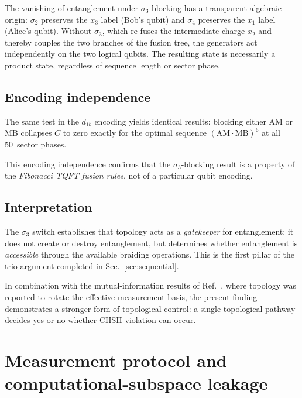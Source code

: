\documentclass[aps,pra,twocolumn,superscriptaddress,longbibliography,floatfix,nofootinbib]{revtex4-2}
\begin{document}
The vanishing of entanglement under $\sigma_3$-blocking has a
transparent algebraic origin:
$\sigma_2$ preserves the $x_3$ label (Bob's qubit) and $\sigma_4$
preserves the $x_1$ label (Alice's qubit).
Without $\sigma_3$, which re-fuses the intermediate charge $x_2$ and
thereby couples the two branches of the fusion tree, the generators
act independently on the two logical qubits.
The resulting state is necessarily a product state, regardless of
sequence length or sector phase.

\subsection{Encoding independence}

The same test in the $d_{1b}$ encoding yields identical results:
blocking either $\text{AM}$ or $\text{MB}$ collapses $C$ to zero
exactly for the optimal sequence $(\text{AM}\cdot\text{MB})^6$ at
all 50~sector phases.

This encoding independence confirms that the $\sigma_3$-blocking
result is a property of the \emph{Fibonacci TQFT fusion rules}, not
of a particular qubit encoding.

\subsection{Interpretation}

The $\sigma_3$ switch establishes that topology acts as a
\emph{gatekeeper} for entanglement:
it does not create or destroy entanglement, but determines
whether entanglement is \emph{accessible} through the available
braiding operations.
This is the first pillar of the trio argument completed in
Sec.~\ref{sec:sequential}.

In combination with the mutual-information results of
Ref.~\cite{Sayim2026topological}, where topology was reported to rotate the
effective measurement basis, the present finding demonstrates a
stronger form of topological control: a single topological
pathway decides yes-or-no whether CHSH violation can occur.


\section{Measurement protocol and computational-subspace leakage}
\label{sec:protocol}
\end{document}
